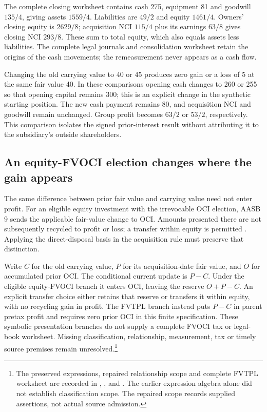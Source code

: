 The complete closing worksheet contains cash 275, equipment 81 and goodwill
$135/4$, giving assets $1559/4$. Liabilities are $49/2$ and equity $1461/4$.
Owners' closing equity is $2629/8$; acquisition NCI $115/4$ plus its earnings
$63/8$ gives closing NCI $293/8$. These sum to total equity, which also equals
assets less liabilities. The complete legal journals and consolidation
worksheet retain the origins of the cash movements; the remeasurement never
appears as a cash flow.

Changing the old carrying value to 40 or 45 produces zero gain or a loss of 5
at the same fair value 40. In these comparisons opening cash changes to 260
or 255 so that opening capital remains 300; this is an explicit change in the
synthetic starting position. The new cash payment remains 80, and acquisition
NCI and goodwill remain unchanged. Group profit becomes $63/2$ or $53/2$,
respectively. This comparison isolates the signed prior-interest result
without attributing it to the subsidiary's outside shareholders.

\subsection{An equity-FVOCI election changes where the gain appears}

The same difference between prior fair value and carrying value need not enter
profit. For an eligible equity investment with the irrevocable OCI election,
AASB 9 sends the applicable fair-value change to OCI. Amounts presented there
are not subsequently recycled to profit or loss; a transfer within equity is
permitted \citep[para.~5.7.5 and B5.7.1]{aasb9scope2026}. Applying the
direct-disposal basis in the acquisition rule must preserve that distinction.

Write $C$ for the old carrying value, $P$ for its acquisition-date fair value,
and $O$ for accumulated prior OCI. The conditional current update is $P-C$.
Under the eligible equity-FVOCI branch it enters OCI, leaving the reserve
$O+P-C$. An explicit transfer choice either retains that reserve or transfers
it within equity, with no recycling gain in profit. The FVTPL branch instead
puts $P-C$ in parent pretax profit and requires zero prior OCI in this finite
specification. These symbolic presentation branches do not supply a complete
FVOCI tax or legal-book worksheet. Missing classification, relationship,
measurement, tax or timely source premises remain unresolved.\footnote{The
preserved expressions, repaired relationship scope and complete FVTPL worksheet
are recorded in
,
, and
.
The earlier expression algebra alone did not establish classification scope.
The repaired scope records supplied assertions, not actual source admission.}

